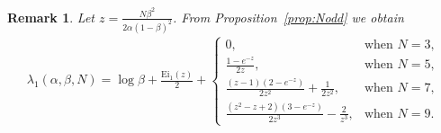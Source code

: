 \documentclass[12pt]{article}
\newtheorem{remark}{Remark}
\newcommand{\1}{\mathbf{1}}
\begin{document}
\begin{remark}
Let  $z=\frac{N\beta^2}{2\alpha (1-\beta)^2}$.
From Proposition~\ref{prop:Nodd} we obtain
\begin{align*}
\lambda_1(\alpha,\beta,N)=\log\beta
+\frac{\mathrm{Ei}_1 \left(z\right)}2 +
\begin{cases}
\displaystyle
0, &\text{when }N=3, \\[2mm]
\displaystyle
\frac{1-e^{-z}}{2z}, &\text{when }N=5, \\[2mm]
\displaystyle
\frac{(z-1)(2-e^{-z})}{ 2z^2}+\frac1{2z^2}, &\text{when }N=7, \\[2mm] 
\displaystyle
\frac{(z^2-z+2)(3-e^{-z})}{2z^3}-\frac2{z^3}, &\text{when }N=9.
\end{cases}
\end{align*}
\end{remark}

\vspace{10mm}
\end{document}
